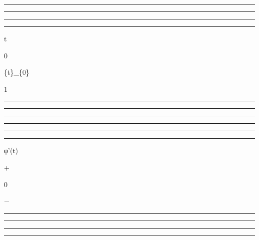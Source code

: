 \documentclass[]{article}
\begin{document}
\begin{center}\rule{3in}{0.4pt}\end{center}

\begin{center}\rule{3in}{0.4pt}\end{center}

\begin{center}\rule{3in}{0.4pt}\end{center}

\begin{center}\rule{3in}{0.4pt}\end{center}

t

0

\{t\}\_\{0\}

1

\begin{center}\rule{3in}{0.4pt}\end{center}

\begin{center}\rule{3in}{0.4pt}\end{center}

\begin{center}\rule{3in}{0.4pt}\end{center}

\begin{center}\rule{3in}{0.4pt}\end{center}

\begin{center}\rule{3in}{0.4pt}\end{center}

\begin{center}\rule{3in}{0.4pt}\end{center}

φ'(t)

+

0

−

\begin{center}\rule{3in}{0.4pt}\end{center}

\begin{center}\rule{3in}{0.4pt}\end{center}

\begin{center}\rule{3in}{0.4pt}\end{center}

\begin{center}\rule{3in}{0.4pt}\end{center}
\end{document}
